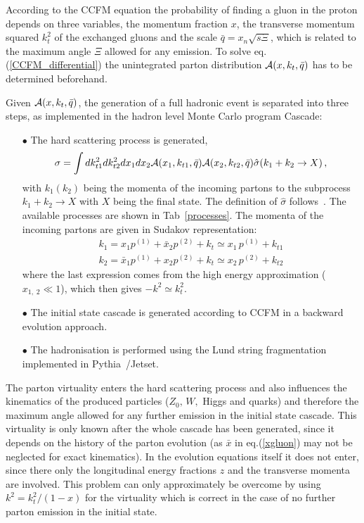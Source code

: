 \documentclass[11pt]{article} \usepackage{mystyle-new}
\newcommand{\cA}{{\cal A}}
\newcommand{\Pmax}{\bar{q}}
\def\prp{t}
\newcommand{\kt}{k_{t}}
\def\kti#1{\ensuremath{k_{\prp #1}}}
\newcommand{\JETSETMC}{\PYTHIAMC}
\newcommand{\PYTHIAMC}{Pythia61}
\def\CASCADE{{\sc Cascade}}
\def\PYTHIA{{\sc Pythia}}
\def\JETSET{{\sc Jetset}}
\begin{document}
According to the CCFM equation the probability of finding a gluon in
the proton depends on three variables, the momentum fraction $x$, the
transverse momentum squared $k_t^2$ of the exchanged gluons and the
scale $\Pmax = x_{n} \sqrt{s \Xi}$, which is related to the
maximum angle $\Xi$ allowed for any emission. 
To solve eq.(\ref{CCFM_differential}) the unintegrated parton
distribution $\cA(x,\kt,\Pmax)$ has to be determined beforehand. 
\par
Given $\cA(x,\kt,\Pmax)$, the generation of a full hadronic event is separated
into three steps, as implemented in the hadron level Monte Carlo program 
\CASCADE: 
\begin{itemize}
\item[$\bullet$] 
The hard scattering process is generated,
\begin{equation}
\sigma = \int d\kti{1}^2 d\kti{2}^2 dx_1dx_2 {\cal A}(x_1,\kti{1},\Pmax)
{\cal A}(x_2,\kti{2},\Pmax) \hat{\sigma} (k_1+k_2 \to X )\,,
\label{x_section}
\end{equation}
with $k_1 (k_2)$ being the momenta of the incoming partons to the subprocess $k_1 + k_2 \to X$ with  $X$ being the final state. The definition of $\hat{\sigma}$ follows~\cite{Catani:1990eg}. 
The available processes are shown in Tab~\ref{processes}.
The momenta of the incoming partons  are  given in Sudakov representation:
\begin{eqnarray*}
 k_1 = x_1 p^{(1)} + \bar{x}_2 p^{(2)} + k_t \simeq x_1 \,p^{(1)}  + \kti{1}\\
 k_2 = \bar{x}_1 p^{(1)} + x_2 p^{(2)} + k_t \simeq x_2 \,p^{(2)}  + \kti{2}
 \label{xgluon}
\end{eqnarray*}
where the last expression comes from the high energy approximation ($x_{1,\;2} \ll
1$), which then gives  $-k^2 \simeq k_t^2$.
\item[$\bullet$] The initial state cascade is generated according to
  CCFM in a backward evolution approach.
\item[$\bullet$] The hadronisation is performed using the Lund string
  fragmentation implemented in \PYTHIA\ /\JETSET \cite{\JETSETMC}.
\end{itemize}

The parton virtuality enters the hard scattering process and also influences
the kinematics of the produced particles ($Z_0,\, W,$ Higgs and quarks) and therefore the maximum angle
allowed for any further emission in the initial state cascade. This
virtuality is only known after the whole cascade has been generated,
since it depends on the history of the parton evolution
(as $\bar{x}$ in eq.(\ref{xgluon}) may not be neglected for exact
kinematics).  In the
evolution equations itself it does not enter, since there only the
longitudinal energy fractions $z$ and the transverse momenta are
involved.  This problem can only approximately be overcome by using
$k^2 = k_t^2/(1-x)$ for the virtuality which is correct in the case
of no further parton emission in the initial state.
\end{document}
